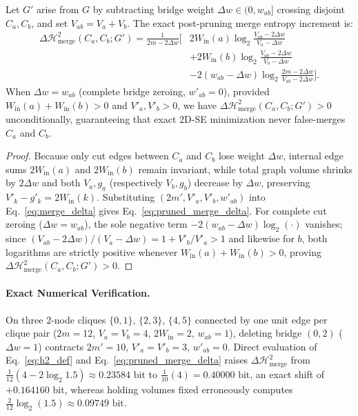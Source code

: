 \begin{proposition}
\label{prop:exact_prune}
Let $G'$ arise from $G$ by subtracting bridge weight $\Delta w \in (0, w_{ab}]$ crossing disjoint $C_a, C_b$, and set $V_{ab} = V_a + V_b$. The exact post-pruning merge entropy increment is:
\begin{equation}
\label{eq:pruned_merge_delta}
\begin{aligned}
\Delta\mathcal{H}^2_{\text{merge}}(C_a, C_b; G') = \frac{1}{2m - 2\Delta w}\Big[ &2W_{\text{in}}(a)\log_2\frac{V_{ab}-2\Delta w}{V_a-\Delta w} \\
&+ 2W_{\text{in}}(b)\log_2\frac{V_{ab}-2\Delta w}{V_b-\Delta w} \\
&- 2(w_{ab}-\Delta w)\log_2\frac{2m-2\Delta w}{V_{ab}-2\Delta w}\Big].
\end{aligned}
\end{equation}
When $\Delta w = w_{ab}$ (complete bridge zeroing, $w'_{ab} = 0$), provided $W_{\text{in}}(a)+W_{\text{in}}(b) > 0$ and $V'_a, V'_b > 0$, we have $\Delta\mathcal{H}^2_{\text{merge}}(C_a, C_b; G') > 0$ unconditionally, guaranteeing that exact 2D-SE minimization never false-merges $C_a$ and $C_b$.
\end{proposition}

\begin{proof}
Because only cut edges between $C_a$ and $C_b$ lose weight $\Delta w$, internal edge sums $2W_{\text{in}}(a)$ and $2W_{\text{in}}(b)$ remain invariant, while total graph volume shrinks by $2\Delta w$ and both $V_a, g_a$ (respectively $V_b, g_b$) decrease by $\Delta w$, preserving $V'_k - g'_k = 2W_{\text{in}}(k)$. Substituting $(2m', V'_a, V'_b, w'_{ab})$ into Eq.~\eqref{eq:merge_delta} gives Eq.~\eqref{eq:pruned_merge_delta}. For complete cut zeroing ($\Delta w = w_{ab}$), the sole negative term $-2(w_{ab}-\Delta w)\log_2(\cdot)$ vanishes; since $(V_{ab}-2\Delta w)/(V_a-\Delta w) = 1 + V'_b/V'_a > 1$ and likewise for $b$, both logarithms are strictly positive whenever $W_{\text{in}}(a)+W_{\text{in}}(b)>0$, proving $\Delta\mathcal{H}^2_{\text{merge}}(C_a,C_b;G') > 0$.
\end{proof}

\paragraph{Exact Numerical Verification.}
On three $2$-node cliques $\{0,1\}$, $\{2,3\}$, $\{4,5\}$ connected by one unit edge per clique pair ($2m=12$, $V_a=V_b=4$, $2W_{\text{in}}=2$, $w_{ab}=1$), deleting bridge $(0,2)$ ($\Delta w=1$) contracts $2m'=10$, $V'_a=V'_b=3$, $w'_{ab}=0$. Direct evaluation of Eq.~\eqref{eq:h2_def} and Eq.~\eqref{eq:pruned_merge_delta} raises $\Delta\mathcal{H}^2_{\text{merge}}$ from $\frac{1}{12}(4 - 2\log_2 1.5) \approx 0.23584\text{ bit}$ to $\frac{1}{10}(4) = 0.40000\text{ bit}$, an exact shift of \textbf{$+0.164160\text{ bit}$}, whereas holding volumes fixed erroneously computes $\frac{2}{12}\log_2(1.5) \approx 0.09749\text{ bit}$.

